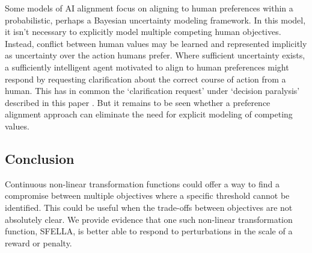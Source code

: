 Some models of AI alignment focus on \cite{russell2019human} aligning to human preferences within a probabilistic, perhaps a Bayesian uncertainty modeling framework.  In this model, it isn't necessary to explicitly model multiple competing human objectives. Instead, conflict between human values may be learned and represented implicitly as uncertainty over the action humans prefer. Where sufficient uncertainty exists, a sufficiently intelligent agent motivated to align to human preferences might respond by requesting clarification about the correct course of action from a human. This has in common the `clarification request' under `decision paralysis' described in this paper%
. But it remains to be seen whether a preference alignment approach can eliminate the need for explicit modeling of competing values.

\subsection{Conclusion}

Continuous non-linear transformation functions could offer a way to find a compromise between multiple objectives where a specific threshold cannot be identified. This could be useful when the trade-offs between objectives are not absolutely clear. We provide evidence that one such non-linear transformation function, SFELLA, is better able to respond to perturbations in the scale of a reward or penalty.